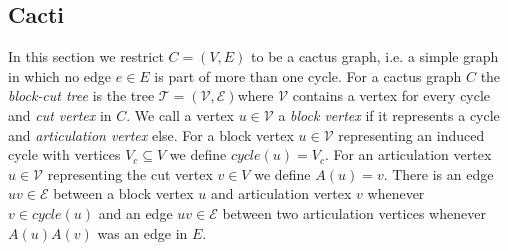\documentclass[a4paper,english,numberwithinsect]{eurocg18}
\begin{document}
\subsection{Cacti}
\label{sec:cactus}
In this section we restrict $ C = (V,E) $ to be a cactus graph, i.e. a simple graph in which no edge $ e \in E $ is part of more than one cycle. For a cactus graph $ C $ the \emph{block-cut tree} is the tree $ \mathcal T = (\mathcal V, \mathcal E) $where $ \mathcal V $ contains a vertex for every cycle and \emph{cut vertex} in $ C $. We call a vertex $ u \in \mathcal V $ a \emph{block vertex} if it represents a cycle and \emph{articulation vertex} else. For a block vertex $ u \in \mathcal V $ representing an induced cycle with vertices $ V_c \subseteq V $ we define $ \textit{cycle}(u) = V_c$. For an articulation vertex $ u \in \mathcal V $ representing the cut vertex $ v \in V $ we define $ A(u) = v $. There is an edge $ uv \in \mathcal E $ between a block vertex $ u $ and articulation vertex $ v $ whenever $ v \in \textit{cycle}(u) $ and an edge $ uv \in \mathcal E $ between two articulation vertices whenever $ A(u)A(v) $ was an edge in $ E $.
\end{document}
